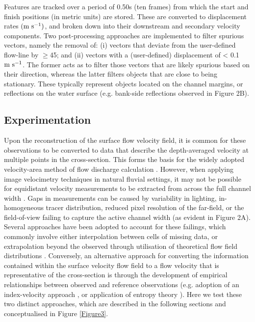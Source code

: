 \documentclass[hess, manuscript]{copernicus}
\begin{document}
Features are tracked over a period of 0.50s (ten frames) from which the start and finish positions (in metric units) are stored. These are converted to displacement rates $(\textnormal{m s\textsuperscript{-1}})$, and broken down into their downstream and secondary velocity components. Two post-processing approaches are implemented to filter spurious vectors, namely the removal of: (i) vectors that deviate from the user-defined flow-line by $\geq$45\degree; and (ii) vectors with a (user-defined) displacement of < 0.1$\textnormal{m s\textsuperscript{-1}}$. The former acts as to filter those vectors that are likely spurious based on their direction, whereas the latter filters objects that are close to being stationary. These typically represent objects located on the channel margins, or reflections on the water surface (e.g. bank-side reflections observed in Figure 2B).


\subsection{Experimentation} 
\label{experimentation}
Upon the reconstruction of the surface flow velocity field, it is common for these observations to be converted to data that describe the depth-averaged velocity at multiple points in the cross-section. This forms the basis for the widely adopted velocity-area method of flow discharge calculation \citep{Herschy2014}. However, when applying image velocimetry techniques in natural fluvial settings, it may not be possible for equidistant velocity measurements to be extracted from across the full channel width \citep[e.g.][]{Haro2021,Hutley2023}. Gaps in measurements can be caused by variability in lighting, in-homogeneous tracer distribution, reduced pixel resolution of the far-field, or the field-of-view failing to capture the active channel width (as evident in Figure 2A). Several approaches have been adopted to account for these failings, which commonly involve either interpolation between cells of missing data, or extrapolation beyond the observed through utilisation of theoretical flow field distributions \citep{Leitao2018,LeCoz2010, Fulford1986}. Conversely, an alternative approach for converting the information contained within the surface velocity flow field to a flow velocity that is representative of the cross-section is through the development of empirical relationships between observed and reference observations (e.g. adoption of an index-velocity approach \citep{Levesque2012}, or application of entropy theory \citep{Chiu1989, Moramarco2010, vyas2024}). Here we test these two distinct approaches, which are described in the following sections and conceptualised in Figure \ref{Figure3}.
\end{document}
